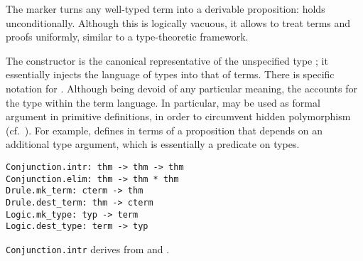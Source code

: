 \begin{isabellebody}
\begin{isamarkuptext}
  The  marker turns any well-typed term into a derivable
  proposition:  holds unconditionally.  Although
  this is logically vacuous, it allows to treat terms and proofs
  uniformly, similar to a type-theoretic framework.

  The  constructor is the canonical representative of
  the unspecified type ; it essentially injects the
  language of types into that of terms.  There is specific notation
   for .
  Although being devoid of any particular meaning, the  accounts for the type \isa{{\isasymtau}} within the term
  language.  In particular,  may be used as formal
  argument in primitive definitions, in order to circumvent hidden
  polymorphism (cf.\ ).  For example,  defines  in terms of
  a proposition  that depends on an additional type
  argument, which is essentially a predicate on types.%
\end{isamarkuptext}%
\isamarkuptrue%
%
\isadelimmlref
%
\endisadelimmlref
%
\isatagmlref
%
\begin{isamarkuptext}%
\begin{mldecls}
  \verb|Conjunction.intr: thm -> thm -> thm| \\
  \verb|Conjunction.elim: thm -> thm * thm| \\
  \verb|Drule.mk_term: cterm -> thm| \\
  \verb|Drule.dest_term: thm -> cterm| \\
  \verb|Logic.mk_type: typ -> term| \\
  \verb|Logic.dest_type: term -> typ| \\
  \end{mldecls}

  \begin{description}

  \item \verb|Conjunction.intr| derives  from  and .


\end{description}
\end{isamarkuptext}
\end{isabellebody}
